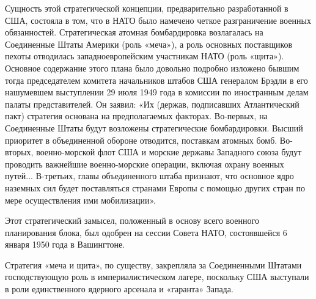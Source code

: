 \documentclass[12pt, a4paper, openany]{book}
\begin{document}
Сущность этой стратегической концепции, предварительно разработанной в США, состояла в том, что в НАТО было намечено четкое разграничение военных обязанностей. Стратегическая атомная бомбардировка возлагалась на Соединенные Штаты Америки (роль «меча»), а роль основных поставщиков пехоты отводилась западноевропейским участникам НАТО (роль «щита»). Основное содержание этого плана было довольно подробно изложено бывшим тогда председателем комитета начальников штабов США генералом Брэдли в его нашумевшем выступлении 29 июля 1949 года в комиссии по иностранным делам палаты представителей. Он заявил: «Их (держав, подписавших Атлантический пакт) стратегия основана на предполагаемых факторах. Во-первых, на Соединенные Штаты будут возложены стратегические бомбардировки. Высший приоритет в объединенной обороне отводится, поставкам атомных бомб. Во-вторых, военно-морской флот США и морские державы Западного союза будут проводить важнейшие военно-морские операции, включая охрану военных путей... В-третьих, главы объединенного штаба признают, что основное ядро наземных сил будет поставляться странами Европы с помощью других стран по мере осуществления ими мобилизации».
	
Этот стратегический замысел, положенный в основу всего военного планирования блока, был одобрен на сессии Совета НАТО, состоявшейся 6 января 1950 года в Вашингтоне.
	
Стратегия «меча и щита», по существу, закрепляла за Соединенными Штатами господствующую роль в империалистическом лагере, поскольку США выступали в роли единственного ядерного арсенала и «гаранта» Запада.
	
\end{document}
